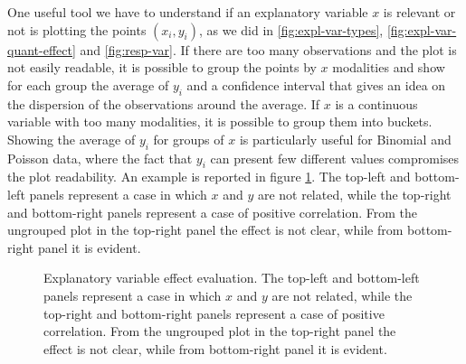 \documentclass[a4paper, twoside, openright, 12pt]{report}
\theoremstyle{definition}
\theoremstyle{definition}
\theoremstyle{definition}
\theoremstyle{remark}
\begin{document}
One useful tool we have to understand if an explanatory variable \(x\) is relevant or not is plotting the points \((x_i, y_i)\), as we did in \ref{fig:expl-var-types}, \ref{fig:expl-var-quant-effect} and \ref{fig:resp-var}. If there are too many observations and the plot is not easily readable, it is possible to group the points by \(x\) modalities and show for each group the average of \(y_i\) and a confidence interval that gives an idea on the dispersion of the observations around the average. If \(x\) is a continuous variable with too many modalities, it is possible to group them into buckets. Showing the average of \(y_i\) for groups of \(x\) is particularly useful for Binomial and Poisson data, where the fact that \(y_i\) can present few different values compromises the plot readability. An example is reported in figure \ref{fig:var-selection}. The top-left and bottom-left panels represent a case in which \(x\) and \(y\) are not related, while the top-right and bottom-right panels represent a case of positive correlation. From the ungrouped plot in the top-right panel the effect is not clear, while from bottom-right panel it is evident.







\begin{figure}[!hbtp]

{\centering {}\newline{}

}

\caption[Explanatory variable effect evaluation.]{Explanatory variable effect evaluation. The top-left and bottom-left panels represent a case in which \(x\) and \(y\) are not related, while the top-right and bottom-right panels represent a case of positive correlation. From the ungrouped plot in the top-right panel the effect is not clear, while from bottom-right panel it is evident.}\label{fig:var-selection}
\end{figure}
\end{document}
